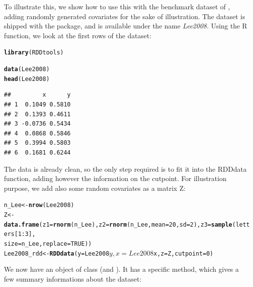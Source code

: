 \documentclass[english,nojss]{jss}\usepackage{graphicx, color}
\makeatletter
\newcommand{\hlfunctioncall}[1]{\textcolor[rgb]{0.501960784313725,0,0.329411764705882}{\textbf{#1}}}%
\newenvironment{kframe}{%
 \def\at@end@of@kframe{}%
 \ifinner\ifhmode%
  \def\at@end@of@kframe{\end{minipage}}%
  \begin{minipage}{\columnwidth}%
 \fi\fi%
 \def\FrameCommand##1{\hskip\@totalleftmargin \hskip-\fboxsep
 \colorbox{shadecolor}{##1}\hskip-\fboxsep
     \hskip-\linewidth \hskip-\@totalleftmargin \hskip\columnwidth}%
 \MakeFramed {\advance\hsize-\width
   \@totalleftmargin\z@ \linewidth\hsize
   \@setminipage}}%
 {\par\unskip\endMakeFramed%
 \at@end@of@kframe}
\newenvironment{knitrout}{}{} %
\makeatother
\begin{document}
To illustrate this, we show how to use this with the benchmark dataset
of \citet{Lee2008}, adding randomly generated covariates for the
sake of illustration. The dataset is shipped with the package, and
is available under the name \emph{Lee2008. }Using the R 
function, we look at the first rows of the dataset:

\begin{knitrout}
\color{fgcolor}\begin{kframe}
\begin{alltt}
\hlfunctioncall{library}(RDDtools)
\end{alltt}


{\ttfamily\noindent\itshape\color{messagecolor}{\#\# KernSmooth 2.23 loaded\\\#\# Copyright M. P. Wand 1997-2009}}\begin{alltt}
\hlfunctioncall{data}(Lee2008)
\hlfunctioncall{head}(Lee2008)
\end{alltt}
\begin{verbatim}
##         x      y
## 1  0.1049 0.5810
## 2  0.1393 0.4611
## 3 -0.0736 0.5434
## 4  0.0868 0.5846
## 5  0.3994 0.5803
## 6  0.1681 0.6244
\end{verbatim}
\end{kframe}
\end{knitrout}


The data is already clean, so the only step required is to fit it
into the RDDdata function, adding however the information on the cutpoint.
For illustration purpose, we add also some random covariates as a
matrix Z:

\begin{knitrout}
\color{fgcolor}\begin{kframe}
\begin{alltt}
n_Lee <- \hlfunctioncall{nrow}(Lee2008)
Z <- \hlfunctioncall{data.frame}(z1 = \hlfunctioncall{rnorm}(n_Lee), z2 = \hlfunctioncall{rnorm}(n_Lee, mean = 20, sd = 2), z3 = \hlfunctioncall{sample}(letters[1:3], 
    size = n_Lee, replace = TRUE))
Lee2008_rdd <- \hlfunctioncall{RDDdata}(y = Lee2008$y, x = Lee2008$x, z = Z, cutpoint = 0)
\end{alltt}
\end{kframe}
\end{knitrout}


We now have an object  of class 
(and ). It has a specific  method,
which gives a few summary informations about the dataset:
\end{document}

